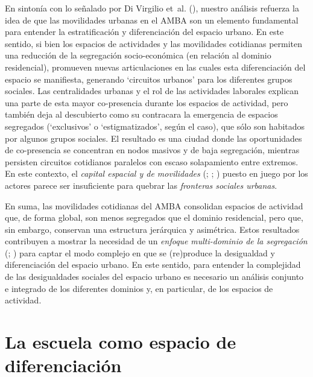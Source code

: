 \documentclass[
  spanish,
  a4paper,%
  chapterprefix=true,%
  DIV=calc,%
  twoside]{scrbook}%
\begin{document}
En sintonía con lo señalado por Di Virgilio et~al. (), nuestro análisis
refuerza la idea de que las movilidades urbanas en el AMBA son un
elemento fundamental para entender la estratificación y diferenciación
del espacio urbano. En este sentido, si bien los espacios de actividades
y las movilidades cotidianas permiten una reducción de la segregación
socio-económica (en relación al dominio residencial), promueven nuevas
articulaciones en las cuales esta diferenciación del espacio se
manifiesta, generando `circuitos urbanos' para los diferentes grupos
sociales. Las centralidades urbanas y el rol de las actividades
laborales explican una parte de esta mayor co-presencia durante los
espacios de actividad, pero también deja al descubierto como su
contracara la emergencia de espacios segregados (`exclusivos' o
`estigmatizados', según el caso), que sólo son habitados por algunos
grupos sociales. El resultado es una ciudad donde las oportunidades de
co-presencia se concentran en nodos masivos y de baja segregación,
mientras persisten circuitos cotidianos paralelos con escaso
solapamiento entre extremos. En este contexto, el \emph{capital espacial y de
movilidades} (; ; ) puesto en juego por
los actores parece ser insuficiente para quebrar las \emph{fronteras sociales
urbanas}.

En suma, las movilidades cotidianas del AMBA consolidan espacios de
actividad que, de forma global, son menos segregados que el dominio
residencial, pero que, sin embargo, conservan una estructura jerárquica
y asimétrica. Estos resultados contribuyen a mostrar la necesidad de un
\emph{enfoque} \emph{multi-dominio de la segregación} (; )
para captar el modo complejo en que se (re)produce la desigualdad y
diferenciación del espacio urbano. En este sentido, para entender la
complejidad de las desigualdades sociales del espacio urbano es
necesario un análisis conjunto e integrado de los diferentes dominios y,
en particular, de los espacios de actividad.

\chapter{La escuela como espacio de diferenciación}\label{school}
\end{document}
